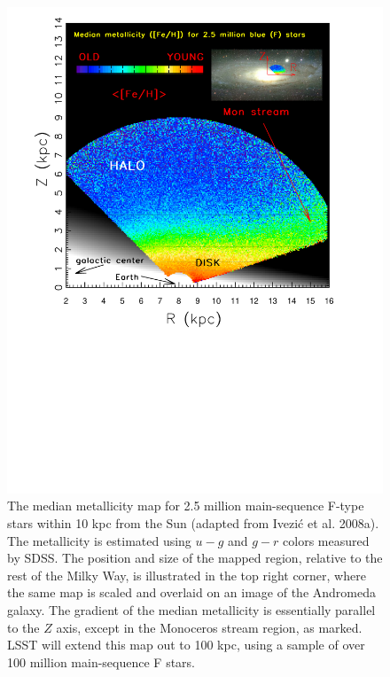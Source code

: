 \documentclass{emulateapj}
\begin{document}
\begin{figure}
\includegraphics[width=1.0\hsize,clip]{panelsLSST.pdf}
\caption{
The median metallicity map for 2.5 million main-sequence F-type stars within 10 kpc 
from the Sun (adapted from Ivezi\'{c} et al. 2008a). The metallicity is estimated using 
$u-g$ and $g-r$ colors measured by SDSS. The position and size of the mapped 
region, relative to the rest of the Milky Way, is illustrated in the top right 
corner, where the same map is scaled and overlaid on an image of the Andromeda 
galaxy. The gradient of the median metallicity is essentially parallel
to the $Z$ axis, except in the Monoceros stream region, as marked. LSST 
will extend this map out to 100 kpc, using a sample of over 100 million 
main-sequence F stars.} 
\label{Fig:FeH3}
\end{figure}
\end{document}
